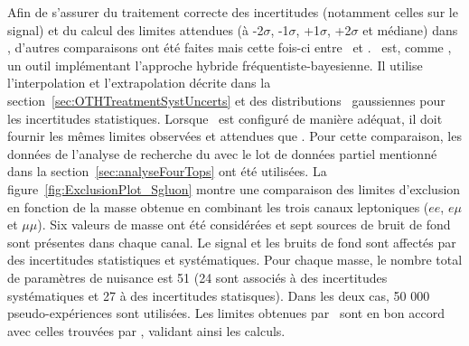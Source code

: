 Afin de s'assurer du traitement correcte des incertitudes (notamment celles sur le signal) et du calcul des limites attendues (\`a -2$\sigma$, -1$\sigma$, +1$\sigma$, +2$\sigma$ et m\'ediane) dans \opthylic, d'autres comparaisons ont \'et\'e faites mais cette fois-ci entre \opthylic~et \mclimit.
\mclimit~est, comme \opthylic, un outil impl\'ementant l'approche hybride fr\'equentiste-bayesienne. Il utilise l'interpolation et l'extrapolation d\'ecrite dans la section~\ref{sec:OTHTreatmentSystUncerts} et des distributions \prior~gaussiennes pour les incertitudes statistiques. Lorsque \opthylic~est configur\'e de mani\`ere ad\'equat, il doit fournir les m\^emes limites observ\'ees et attendues que \mclimit. Pour cette comparaison, 
les donn\'ees de l'analyse de recherche du  avec le lot de donn\'ees partiel mentionn\'e dans la section~\ref{sec:analyseFourTops} 
ont \'et\'e utilis\'ees. La figure~\ref{fig:ExclusionPlot_Sgluon} montre une comparaison des limites d'exclusion en fonction de la masse obtenue en combinant les trois canaux leptoniques ($ee$, $e\mu$ et $\mu\mu$). Six valeurs de masse ont \'et\'e consid\'er\'ees et sept sources de bruit de fond sont pr\'esentes dans chaque canal. Le signal et les bruits de fond sont affect\'es par des incertitudes statistiques et syst\'ematiques. Pour chaque masse, le nombre total de param\`etres de nuisance est 51 (24 sont associ\'es \`a des incertitudes syst\'ematiques et 27 \`a des incertitudes statisques). Dans les deux cas, 50 000 pseudo-exp\'eriences sont utilis\'ees. Les limites obtenues par \opthylic~sont en bon accord avec celles trouv\'ees par \mclimit, validant ainsi les calculs. 
